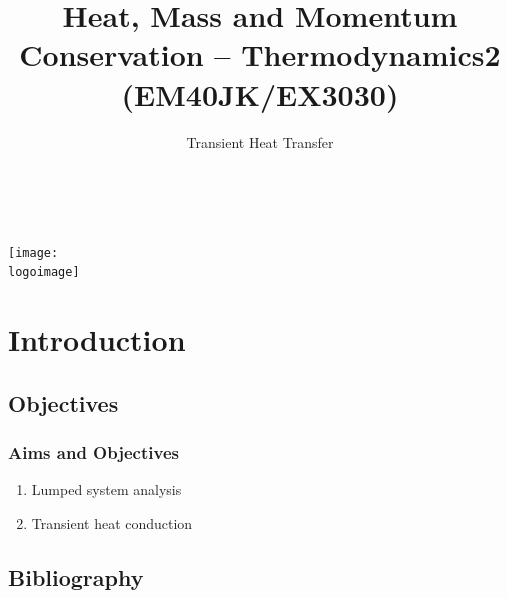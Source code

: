 \documentclass[10pt,compress]{beamer}
\institute{School of Engineering}
\title{Heat, Mass and Momentum Conservation -- Thermodynamics2 (EM40JK/EX3030)}
\subtitle{Transient Heat Transfer}
\date[ ]{ }
\author[\shortname]{%
  \fullname\\\ttfamily{\emailaddress}
}
\newcommand{\logoimage}{../FigBanner/UoAHorizBanner}
\begin{document}
\begin{frame}
  \titlepage
  \vfill%
  \begin{center}
    \texttt{[image: \\logoimage]}
  \end{center}
\end{frame}




\section{Introduction} 


\subsection{Objectives}

\begin{frame}
 \frametitle{Aims and Objectives}
   \begin{enumerate}
     \item Lumped system analysis
     \item Transient heat conduction
   \end{enumerate}
\end{frame}


\subsection{Bibliography} 
\end{document}
